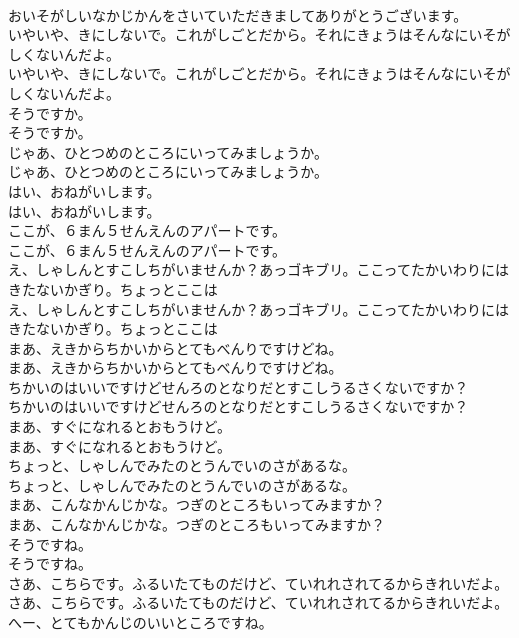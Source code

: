 \documentclass[8pt]{extreport}
\begin{document}
\begin{CJK}{UTF8}{min}
\\	おいそがしいなかじかんをさいていただきましてありがとうございます。
\\	いやいや、きにしないで。これがしごとだから。それにきょうはそんなにいそがしくないんだよ。
\\	いやいや、きにしないで。これがしごとだから。それにきょうはそんなにいそがしくないんだよ。
\\	そうですか。
\\	そうですか。
\\	じゃあ、ひとつめのところにいってみましょうか。
\\	じゃあ、ひとつめのところにいってみましょうか。
\\	はい、おねがいします。
\\	はい、おねがいします。
\\	ここが、６まん５せんえんのアパートです。
\\	ここが、６まん５せんえんのアパートです。
\\	え、しゃしんとすこしちがいませんか？あっゴキブリ。ここってたかいわりにはきたないかぎり。ちょっとここは
\\	え、しゃしんとすこしちがいませんか？あっゴキブリ。ここってたかいわりにはきたないかぎり。ちょっとここは
\\	まあ、えきからちかいからとてもべんりですけどね。
\\	まあ、えきからちかいからとてもべんりですけどね。
\\	ちかいのはいいですけどせんろのとなりだとすこしうるさくないですか？
\\	ちかいのはいいですけどせんろのとなりだとすこしうるさくないですか？
\\	まあ、すぐになれるとおもうけど。
\\	まあ、すぐになれるとおもうけど。
\\	ちょっと、しゃしんでみたのとうんでいのさがあるな。
\\	ちょっと、しゃしんでみたのとうんでいのさがあるな。
\\	まあ、こんなかんじかな。つぎのところもいってみますか？
\\	まあ、こんなかんじかな。つぎのところもいってみますか？
\\	そうですね。
\\	そうですね。
\\	さあ、こちらです。ふるいたてものだけど、ていれれされてるからきれいだよ。
\\	さあ、こちらです。ふるいたてものだけど、ていれれされてるからきれいだよ。
\\	へー、とてもかんじのいいところですね。

\end{CJK}
\end{document}
